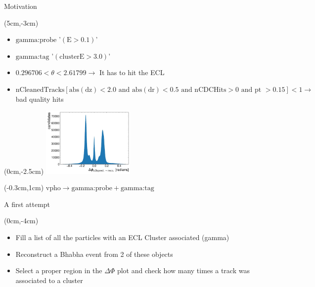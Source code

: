 \documentclass[10pt]{beamer}
\begin{document}
{	
	
	
\begin{frame}{Motivation}
	\begin{textblock*}{0.5\textwidth}(5cm,-3cm)
		

	
	
	\begin{itemize}
		
		\item $\textrm{gamma:probe}$ '$(\textrm{E} > 0.1 )$'
		\item $\textrm{gamma:tag}$ '$(\textrm{clusterE} > 3.0)$'

			\item $0.296706 < \theta < 2.61799 \rightarrow$ It has to hit the ECL
			\item $\textrm{nCleanedTracks}[ \textrm{abs}(\textrm{dz}) < 2.0 \textrm{ and } \textrm{abs}(\textrm{dr}) < 0.5 \textrm{ and nCDCHits} > 0 \textrm{ and pt } > 0.15] < 1 \rightarrow $ bad quality hits 
						
		\end{itemize}

	\end{textblock*}

	
\begin{textblock*}{0.5\textwidth}(0cm,-2.5cm)
	\includegraphics[width=4.5cm]{Plots/deltaPhiSam}
\end{textblock*}

\begin{textblock*}{0.5\textwidth}(-0.3cm,1cm)
	$\textrm{vpho} \rightarrow \textrm{gamma:probe} + \textrm{gamma:tag}$
\end{textblock*}
	
\end{frame}

\begin{frame}{A first attempt}
	\begin{textblock*}{\textwidth}(0cm,-4cm)
	

\begin{itemize}
	\item Fill a list of all the particles with an ECL Cluster associated (gamma)
	\item Reconstruct a Bhabha event from 2 of these objects
	\item Select a proper region in the $\Delta \Phi$ plot and check how many times a track was associated to a cluster
	

\end{itemize}
\end{textblock*}
\end{frame}}
\end{document}
